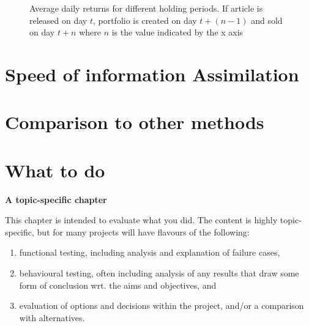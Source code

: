 \begin{figure}[!ht]
      \centering
{}
\label{speed-assimilation}
\caption[Graph of average daily returns for different holding periods]{Average daily returns for different holding periods. If article is released on day $t$, portfolio is created on day $t+(n-1)$ and sold on day $t+n$ where $n$ is the value indicated by the x axis}
\end{figure}


\section{Speed of information Assimilation}

\section{Comparison to other methods}

\section{What to do}

{\bf A topic-specific chapter} 
\vspace{1cm} 

\noindent
This chapter is intended to evaluate what you did.  The content is highly 
topic-specific, but for many projects will have flavours of the following:

\begin{enumerate}
\item functional  testing, including analysis and explanation of failure 
      cases,
\item behavioural testing, often including analysis of any results that 
      draw some form of conclusion wrt. the aims and objectives,
      and
\item evaluation of options and decisions within the project, and/or a
      comparison with alternatives.
\end{enumerate}

